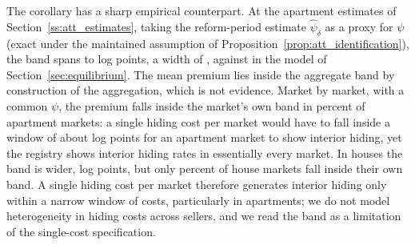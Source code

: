The corollary has a sharp empirical counterpart. At the apartment estimates of Section~\ref{ss:att_estimates}, taking the reform-period estimate $\hat\psi_\delta$ as a proxy for $\psi$ (exact under the maintained assumption of Proposition~\ref{prop:att_identification}), the band spans \attBandLoApt{} to \attBandHiApt{} log points, a width of \attBandWidthApt{}, against \attBandWidthBaseApt{} in the model of Section~\ref{sec:equilibrium}. The mean premium lies inside the aggregate band by construction of the aggregation, which is not evidence. Market by market, with a common $\psi$, the premium falls inside the market's own band in \attShareInBandApt{} percent of apartment markets: a single hiding cost per market would have to fall inside a window of about \attBandWidthApt{} log points for an apartment market to show interior hiding, yet the registry shows interior hiding rates in essentially every market. In houses the band is wider, \attBandWidthHouse{} log points, but only \attShareInBandHouse{} percent of house markets fall inside their own band. A single hiding cost per market therefore generates interior hiding only within a narrow window of costs, particularly in apartments; we do not model heterogeneity in hiding costs across sellers, and we read the band as a limitation of the single-cost specification.
